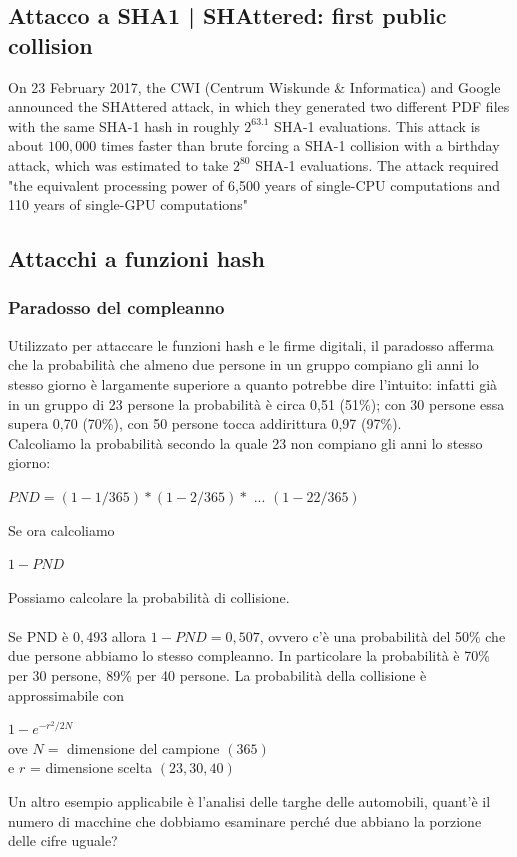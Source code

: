 \documentclass[11pt, oneside]{article}   	%
\begin{document}
\subsection*{Attacco a SHA1 | SHAttered: first public collision}
On 23 February 2017, the CWI (Centrum Wiskunde \& Informatica) and Google announced the SHAttered attack, in which they generated two different PDF files with the same SHA-1 hash in roughly $2^{63.1}$ SHA-1 evaluations. This attack is about $100,000$ times faster than brute forcing a SHA-1 collision with a birthday attack, which was estimated to take $2^{80}$ SHA-1 evaluations. The attack required "the equivalent processing power of 6,500 years of single-CPU computations and 110 years of single-GPU computations"

\subsection*{Attacchi a funzioni hash}
\subsubsection*{Paradosso del compleanno}
Utilizzato per attaccare le funzioni hash e le firme digitali, il paradosso afferma che la probabilità che almeno due persone in un gruppo compiano gli anni lo stesso giorno è largamente superiore a quanto potrebbe dire l'intuito: infatti già in un gruppo di 23 persone la probabilità è circa 0,51 (51\%); con 30 persone essa supera 0,70 (70\%), con 50 persone tocca addirittura 0,97 (97\%). \\
Calcoliamo la probabilità secondo la quale 23 non compiano gli anni lo stesso giorno:
\begin{center}
$PND = (1 - 1/365) * (1-2/365)*$ $...$ $(1-22/365)$
\end{center}
Se ora calcoliamo \begin{center}
$1-PND$
\end{center}
Possiamo calcolare la probabilità di collisione.\\\\
Se PND è $0,493$ allora $1 - PND = 0,507$, ovvero c'è una probabilità del 50\% che due persone abbiamo lo stesso compleanno. In particolare la probabilità è 70\% per 30 persone, 89\% per 40 persone. La probabilità della collisione è approssimabile con \begin{center}
$1 - e^{-r^2/2N}$\\
ove $N =$ dimensione del campione $(365)$\\
e $r$ = dimensione scelta $(23, 30, 40)$
\end{center}
Un altro esempio applicabile è l'analisi delle targhe delle automobili, quant'è il numero di macchine che dobbiamo esaminare perché due abbiano la porzione delle cifre uguale?
\end{document}
